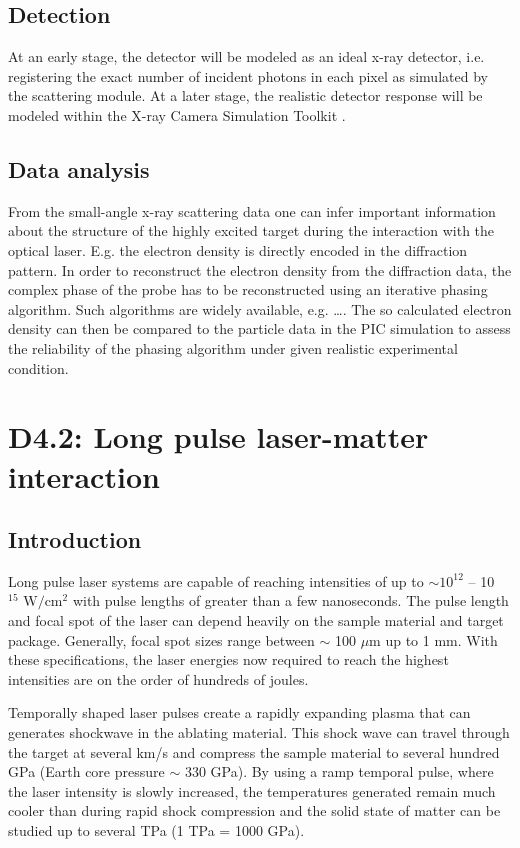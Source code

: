 \documentclass[a4paper]{article}
\begin{document}
\subsection{Detection}
At an early stage, the detector will be modeled as an ideal x-ray detector, i.e. registering the exact number of incident photons in each
pixel as simulated by the scattering module. At a later stage, the realistic detector response will be modeled within the
X-ray Camera Simulation Toolkit \cite{Joy2015}.%
%
\subsection{Data analysis}
From the small-angle x-ray scattering data one can infer important information about the structure of the highly excited target during
the interaction with the optical laser. E.g. the electron density is directly encoded in the diffraction pattern. In order to
reconstruct the electron density from the diffraction data, the complex phase of the probe has to be reconstructed using an iterative phasing
algorithm. Such algorithms are widely available, e.g. \ldots {}.
The so calculated electron density can then be compared to the particle data in the PIC simulation to assess the reliability of
the phasing algorithm under given realistic experimental condition. 

\section{D4.2: Long pulse laser-matter interaction\label{sec:long_pulse}} %
\subsection{Introduction}
Long pulse laser systems are capable of reaching intensities of up to $\sim 10^{12}$ -- 10$^{15} \text{ W}/\text{cm}^2$ with pulse lengths of greater than a few nanoseconds. The pulse length and focal spot of the laser can depend heavily on the sample material and target package. Generally, focal spot sizes range between $\sim$ 100 $\mu$m up to 1 mm. With these specifications, the laser energies now required to reach the highest intensities are on the order of hundreds of joules.

Temporally shaped laser pulses create a rapidly expanding plasma that can generates shockwave in the ablating material. This shock wave can travel through the target at several km/s and compress the sample material to several hundred GPa (Earth core pressure $\sim$ 330 GPa). By using a ramp temporal pulse, where the laser intensity is slowly increased, the temperatures generated remain much cooler than during rapid shock compression and the solid state of matter can be studied up to several TPa (1 TPa = 1000 GPa).
\end{document}
